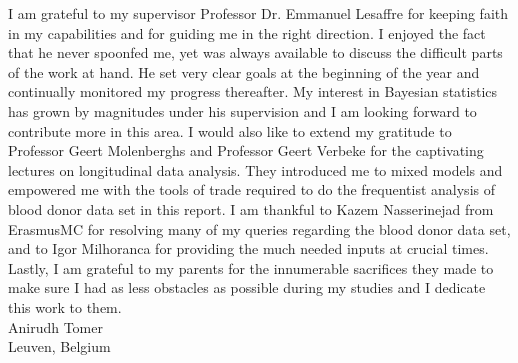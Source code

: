 I am grateful to my supervisor Professor Dr. Emmanuel Lesaffre for keeping faith in my capabilities and for guiding me in the right direction. I enjoyed the fact that he never spoonfed me, yet was always available to discuss the difficult parts of the work at hand. He set very clear goals at the beginning of the year and continually monitored my progress thereafter. My interest in Bayesian statistics has grown by magnitudes under his supervision and I am looking forward to contribute more in this area. I would also like to extend my gratitude to Professor Geert Molenberghs and Professor Geert Verbeke for the captivating lectures on longitudinal data analysis. They introduced me to mixed models and empowered me with the tools of trade required to do the frequentist analysis of blood donor data set in this report. I am thankful to Kazem Nasserinejad from ErasmusMC for resolving many of my queries regarding the blood donor data set, and to Igor Milhoranca for providing the much needed inputs at crucial times. Lastly, I am grateful to my parents for the innumerable sacrifices they made to make sure I had as less obstacles as possible during my studies and I dedicate this work to them.\\

Anirudh Tomer\\
Leuven, Belgium
